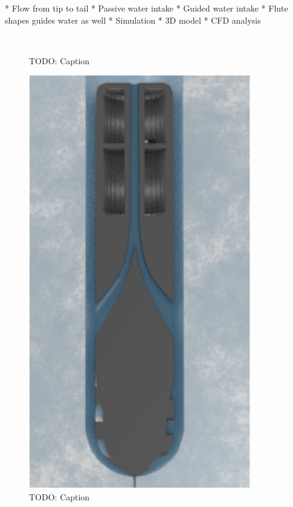 
* Flow from tip to tail
* Passive water intake
	* Guided water intake
	* Flute shapes guides water as well
* Simulation
	* 3D model
	* CFD analysis

\begin{figure}[htb]
	\centering
	\\
	\caption{TODO: Caption}
	\label{fig:3d_model}
\end{figure}

\begin{figure}[htb]
	\centering
	\includegraphics[width=.5\textwidth]{figures/convection/water_transportation}
	\caption{TODO: Caption}
	\label{fig:water_transportation}
\end{figure}

